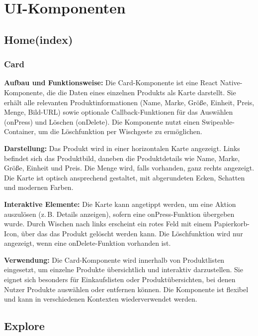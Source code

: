 \section{UI-Komponenten}
\label{sec:ui_komponenten}

\subsection{Home(index)}

\subsubsection{Card}

\noindent\textbf{Aufbau und Funktionsweise:}
Die Card-Komponente ist eine React Native-Komponente, die die Daten eines einzelnen Produkts als Karte darstellt. Sie erhält alle relevanten Produktinformationen (Name, Marke, Größe, Einheit, Preis, Menge, Bild-URL) sowie optionale Callback-Funktionen für das Auswählen (onPress) und Löschen (onDelete). Die Komponente nutzt einen Swipeable-Container, um die Löschfunktion per Wischgeste zu ermöglichen.

\noindent\textbf{Darstellung:}
Das Produkt wird in einer horizontalen Karte angezeigt. Links befindet sich das Produktbild, daneben die Produktdetails wie Name, Marke, Größe, Einheit und Preis. Die Menge wird, falls vorhanden, ganz rechts angezeigt. Die Karte ist optisch ansprechend gestaltet, mit abgerundeten Ecken, Schatten und modernen Farben.

\noindent\textbf{Interaktive Elemente:}
Die Karte kann angetippt werden, um eine Aktion auszulösen (z.\,B. Details anzeigen), sofern eine onPress-Funktion übergeben wurde. Durch Wischen nach links erscheint ein rotes Feld mit einem Papierkorb-Icon, über das das Produkt gelöscht werden kann. Die Löschfunktion wird nur angezeigt, wenn eine onDelete-Funktion vorhanden ist.

\noindent\textbf{Verwendung:}
Die Card-Komponente wird innerhalb von Produktlisten eingesetzt, um einzelne Produkte übersichtlich und interaktiv darzustellen. Sie eignet sich besonders für Einkaufslisten oder Produktübersichten, bei denen Nutzer Produkte auswählen oder entfernen können. Die Komponente ist flexibel und kann in verschiedenen Kontexten wiederverwendet werden.

\subsection{Explore}

